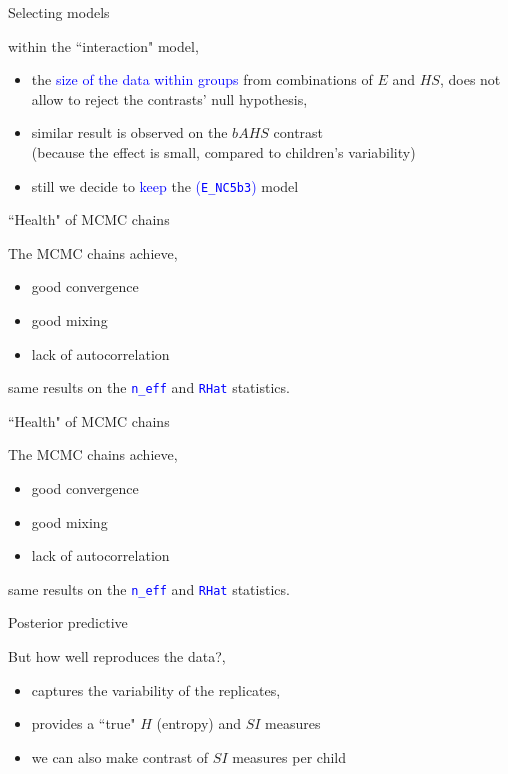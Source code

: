 %
%
\begin{lhframe}[rhgraphic={\texttt{[image: contrasts.png]}}]
	{Selecting models}
	
	within the ``interaction" model,
	\begin{itemize}
		\item the \textcolor{blue}{size of the data within groups} from combinations of $E$ and $HS$, does not allow to reject the contrasts' null hypothesis,
		\item similar result is observed on the $bAHS$ contrast \\
		{\small (because the effect is small, compared to children's variability)}
		\item still we decide to \textcolor{blue}{keep} the \textcolor{blue}{(\texttt{E\_NC5b3})} model 
	\end{itemize}
\end{lhframe}
%
%
\begin{lhframe}[rhgraphic={\texttt{[image: chains\_real1.pdf]}}]
	{``Health" of MCMC chains}
	
	The MCMC chains achieve,
	\begin{itemize}
		\item good convergence
		\item good mixing
		\item lack of autocorrelation
	\end{itemize}
	
	same results on the \textcolor{blue}{ \texttt{n\_eff} } and \textcolor{blue}{ \texttt{RHat} } statistics.
\end{lhframe}
%
%
\begin{lhframe}[rhgraphic={\texttt{[image: chains\_real2.pdf]}}]
	{``Health" of MCMC chains}
	
	The MCMC chains achieve,
	\begin{itemize}
		\item good convergence
		\item good mixing
		\item lack of autocorrelation
	\end{itemize}
	
	same results on the \textcolor{blue}{ \texttt{n\_eff} } and \textcolor{blue}{ \texttt{RHat} } statistics.
\end{lhframe}
%
%
\begin{lhframe}[rhgraphic={\texttt{[image: posterior\_predictive\_real.pdf]}}]
	{Posterior predictive}
	
	But how well reproduces the data?,
	\begin{itemize}
		\item captures the variability of the replicates,
		\item provides a ``true" $H$ (entropy) and $SI$ measures
		\item we can also make contrast of $SI$ measures per child
	\end{itemize}
\end{lhframe}
